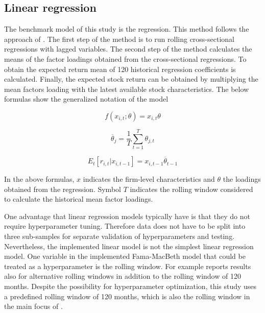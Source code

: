 \documentclass[12pt]{article}
\begin{document}
\subsection{Linear regression}\label{LinearRegression}
The benchmark model of this study is the \citet{FamaMacBeth1973} regression.\footnotemark {}  This method follows the approach of \citet{Lewellen2015}.\footnotemark {} The first step of the method is to run rolling cross-sectional regressions with lagged variables. The second step of the method calculates the means of the factor loadings obtained from the cross-sectional regressions. To obtain the expected return mean of 120 historical regression coefficients is calculated. Finally, the expected stock return can be obtained by multiplying the mean factors loading with the latest available stock characteristics. The below formulas show the generalized notation of the model \par

\begin{equation}
f(x_{i, t}; \theta) = x_{i, t}  \theta
\end{equation}

\begin{equation}
\overline \theta_j = \frac{1}{T} \sum^{T}_{t=1}\theta_{j, t}
\end{equation}

\begin{equation}
E_t \left[ r_{i, t} | x_{i, t-1} \right] = x_{i, t-1} \overline \theta_{t-1}
\end{equation}

In the above formulas, $x$ indicates the firm-level characteristics and $\theta$ the loadings obtained from the regression. Symbol $T$ indicates the rolling window considered to calculate the historical mean factor loadings. \par

One advantage that linear regression models typically have is that they do not require hyperparameter tuning. Therefore data does not have to be split into three sub-samples for separate validation of hyperparameters and testing. Nevertheless, the implemented linear model is not the simplest linear regression model. One variable in the implemented Fama-MacBeth model that could be treated as a hyperparameter is the rolling window. For example \citet{Lewellen2015} reports results also for alternative rolling windows in addition to the rolling window of 120 months. Despite the possibility for hyperparameter optimization, this study uses a predefined rolling window of 120 months, which is also the rolling window in the main focus of \citeauthor{Lewellen2015}.\footnotemark {} \par
\end{document}
